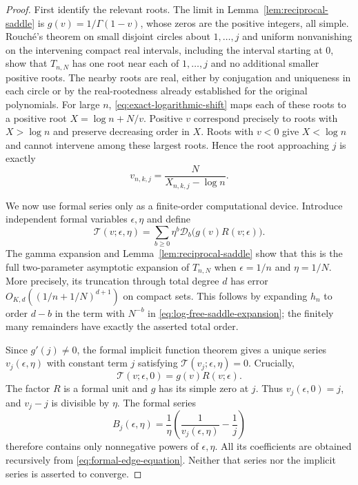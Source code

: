 \begin{proof}
First identify the relevant roots.  The limit in
Lemma~\ref{lem:reciprocal-saddle} is
$g(v)=1/\Gamma(1-v)$, whose zeros are the positive integers,
all simple.  Rouch\'e's theorem on small disjoint circles about
$1,\ldots,j$ and uniform nonvanishing on the intervening compact
real intervals, including the interval starting at $0$, show that
$T_{n,N}$ has one root near each of $1,\ldots,j$ and no additional
smaller positive roots.  The nearby roots are real, either by
conjugation and uniqueness in each circle or by the real-rootedness
already established for the original polynomials.  For large $n$,
\eqref{eq:exact-logarithmic-shift} maps each of these roots to a
positive root $X=\log n+N/v$.  Positive $v$ correspond precisely to
roots with $X>\log n$ and preserve decreasing order in $X$.
Roots with $v<0$ give $X<\log n$ and cannot intervene among these
largest roots.  Hence the root approaching $j$ is exactly
\[
 v_{n,k,j}=\frac{N}{X_{n,k,j}-\log n}.
\]

We now use formal series only as a finite-order computational device.
Introduce independent formal variables $\epsilon,\eta$ and define
\begin{equation}\label{eq:formal-edge-equation}
 \mathcal T(v;\epsilon,\eta)
   =\sum_{b\geq0}\eta^b
           \mathcal D_b\bigl(g(v)R(v;\epsilon)\bigr).
\end{equation}
The gamma expansion and Lemma~\ref{lem:reciprocal-saddle} show that
this is the full two-parameter asymptotic expansion of $T_{n,N}$
when $\epsilon=1/n$ and $\eta=1/N$.  More precisely, its truncation
through total degree $d$ has error $O_{K,d}((1/n+1/N)^{d+1})$
on compact sets.  This follows by expanding $h_n$ to order $d-b$
in the term with $N^{-b}$ in
\eqref{eq:log-free-saddle-expansion}; the finitely many remainders
have exactly the asserted total order.

Since $g'(j)\ne0$, the formal implicit function theorem gives a
unique series $v_j(\epsilon,\eta)$ with constant term $j$ satisfying
$\mathcal T(v_j;\epsilon,\eta)=0$.  Crucially,
\[
 \mathcal T(v;\epsilon,0)=g(v)R(v;\epsilon).
\]
The factor $R$ is a formal unit and $g$ has its simple zero at $j$.
Thus $v_j(\epsilon,0)=j$, and $v_j-j$ is divisible by $\eta$.
The formal series
\begin{equation}\label{eq:formal-height-series}
 B_j(\epsilon,\eta)=\frac1\eta
          \left(\frac1{v_j(\epsilon,\eta)}-\frac1j\right)
\end{equation}
therefore contains only nonnegative powers of $\epsilon,\eta$.
All its coefficients are obtained recursively from
\eqref{eq:formal-edge-equation}.  Neither that series nor the
implicit series is asserted to converge.


\end{proof}
